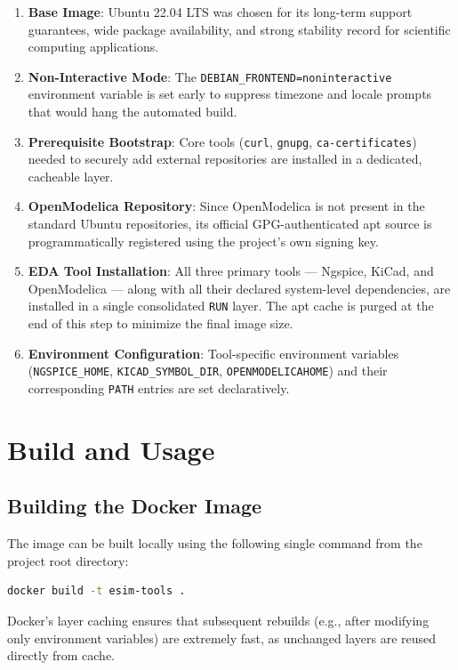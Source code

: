 \documentclass[12pt,a4paper]{report}
\begin{document}
\begin{enumerate}
    \item \textbf{Base Image}: Ubuntu 22.04 LTS was chosen for its long-term support guarantees, wide package availability, and strong stability record for scientific computing applications.
    \item \textbf{Non-Interactive Mode}: The \texttt{DEBIAN\_FRONTEND=noninteractive} environment variable is set early to suppress timezone and locale prompts that would hang the automated build.
    \item \textbf{Prerequisite Bootstrap}: Core tools (\texttt{curl}, \texttt{gnupg}, \texttt{ca-certificates}) needed to securely add external repositories are installed in a dedicated, cacheable layer.
    \item \textbf{OpenModelica Repository}: Since OpenModelica is not present in the standard Ubuntu repositories, its official GPG-authenticated apt source is programmatically registered using the project's own signing key.
    \item \textbf{EDA Tool Installation}: All three primary tools — Ngspice, KiCad, and OpenModelica — along with all their declared system-level dependencies, are installed in a single consolidated \texttt{RUN} layer. The apt cache is purged at the end of this step to minimize the final image size.
    \item \textbf{Environment Configuration}: Tool-specific environment variables (\texttt{NGSPICE\_HOME}, \texttt{KICAD\_SYMBOL\_DIR}, \texttt{OPENMODELICAHOME}) and their corresponding \texttt{PATH} entries are set declaratively.
\end{enumerate}

\section{Build and Usage}

\subsection{Building the Docker Image}
The image can be built locally using the following single command from the project root directory:

\begin{lstlisting}[language=bash, caption={Building the Docker Image}]
docker build -t esim-tools .
\end{lstlisting}

Docker's layer caching ensures that subsequent rebuilds (e.g., after modifying only environment variables) are extremely fast, as unchanged layers are reused directly from cache.
\end{document}
